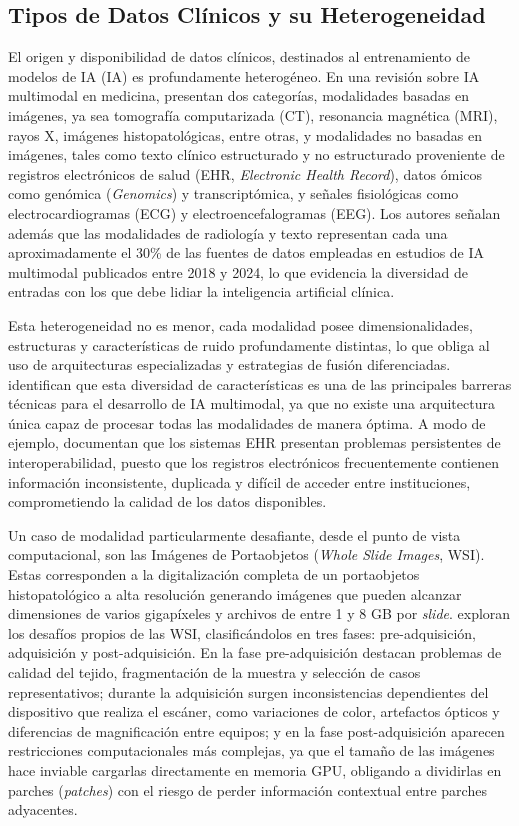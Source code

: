 \subsection{Tipos de Datos Clínicos y su Heterogeneidad}

El origen y disponibilidad de datos clínicos, destinados al entrenamiento de modelos de \gls{IA} (IA) es 
profundamente heterogéneo. En una revisión sobre IA multimodal en medicina, 
\textcite{schouten2024} presentan dos categorías, modalidades basadas en imágenes, ya sea tomografía 
computarizada (CT), resonancia magnética (MRI), rayos X, imágenes histopatológicas, entre otras, y 
modalidades no basadas en imágenes, tales como texto clínico estructurado y no estructurado proveniente 
de registros electrónicos de salud (EHR, \textit{Electronic Health Record}), datos ómicos como genómica (\textit{Genomics}) y transcriptómica, y señales 
fisiológicas como electrocardiogramas (ECG) y electroencefalogramas (EEG). Los autores señalan 
además que las modalidades de radiología y texto representan cada una aproximadamente el 30\% de 
las fuentes de datos empleadas en estudios de IA multimodal publicados entre 2018 y 2024, lo que 
evidencia la diversidad de entradas con los que debe lidiar la inteligencia artificial clínica.

Esta heterogeneidad no es menor, cada modalidad posee dimensionalidades, estructuras 
y características de ruido profundamente distintas, lo que obliga al uso de arquitecturas especializadas 
y estrategias de fusión diferenciadas. \textcite{schouten2024} identifican que esta diversidad de 
características es una de las principales barreras técnicas para el desarrollo de IA multimodal, ya 
que no existe una arquitectura única capaz de procesar todas las modalidades de manera óptima.
A modo de ejemplo, \textcite{Makhni2025} documentan que los sistemas EHR presentan 
problemas persistentes de interoperabilidad, puesto que los registros electrónicos frecuentemente contienen 
información inconsistente, duplicada y difícil de acceder entre instituciones, comprometiendo la 
calidad de los datos disponibles.

Un caso de modalidad particularmente desafiante, desde el punto de vista computacional, son las Imágenes de 
Portaobjetos (\textit{Whole Slide Images}, WSI). Estas corresponden a la digitalización completa de un 
portaobjetos histopatológico a alta resolución generando imágenes que pueden alcanzar dimensiones de varios 
gigapíxeles y archivos de entre 1 y 8 GB por \textit{slide}. \textcite{Basak2023} exploran los desafíos propios de las WSI, clasificándolos en tres fases: pre-adquisición, adquisición y post-adquisición. 
En la fase pre-adquisición destacan problemas de calidad del tejido, fragmentación de la muestra y selección de casos representativos;
 durante la adquisición surgen inconsistencias dependientes del dispositivo que realiza el escáner, como variaciones de color, artefactos ópticos y 
 diferencias de magnificación entre equipos; y en la fase post-adquisición aparecen restricciones computacionales más complejas, ya que el 
 tamaño de las imágenes hace inviable cargarlas directamente en memoria GPU, obligando a dividirlas en parches (\textit{patches}) con el riesgo 
 de perder información contextual entre parches adyacentes.

